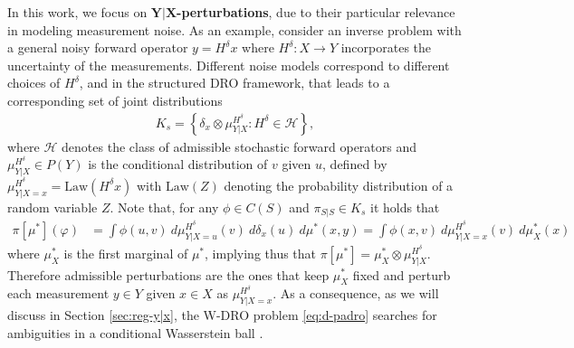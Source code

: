\documentclass{article}
\theoremstyle{definition}
\theoremstyle{remarksty}
\begin{document}
In this work, we focus on \textbf{$\mathbf{Y|X}$-perturbations}, due to their particular relevance in modeling measurement noise. As an example, consider an inverse problem with a general noisy forward operator $y=H^\delta x$ where $H^\delta: X \to Y$ incorporates the uncertainty of the measurements. Different noise models correspond to different choices of $H^\delta$, and in the structured DRO framework, that leads to a corresponding set of joint distributions
\begin{align*}
    K_s = \left\{ \delta_x \otimes \mu_{Y|X}^{H^\delta} : H^\delta \in \mathcal{H} \right\},
\end{align*}
where $\mathcal{H}$ denotes the class of admissible stochastic forward operators and $\mu_{Y|X}^{H^\delta} \in P(Y)$ is the conditional distribution of $v$ given $u$, defined by $\mu_{Y|X=x}^{H^\delta} = \text{Law}(H^\delta x)$ with $\text{Law}(Z)$ denoting the probability distribution of a random variable $Z$. Note that, for any $\phi \in C(S)$ and $\pi_{S|S} \in K_s$ it holds that
\begin{align*}
    \pi[\mu^*](\varphi) &  = \int \phi(u,v)\ d\mu_{Y|X=u}^{H^\delta}(v)\ d\delta_x(u)\ d\mu^*(x,y) 
    = \int \phi(x,v)\ d\mu_{Y|X=x}^{H^\delta}(v)\ d\mu_X^*(x)
\end{align*}
where $\mu_X^*$ is the first marginal of $\mu^*$, implying thus that $\pi[\mu^*] = \mu_X^*\otimes \mu_{Y|X}^{H^\delta}$. 
Therefore admissible perturbations are the ones that keep $\mu_X^*$ fixed and perturb each measurement $y \in Y$ given $x\in X$ as $\mu_{Y|X=x}^{H^\delta}$. As a consequence, as we will discuss in Section \ref{sec:reg-y|x}, the W-DRO problem \eqref{eq:d-padro} searches for ambiguities in a conditional Wasserstein ball \cite{chemseddine_conditional_2025}.
\end{document}

